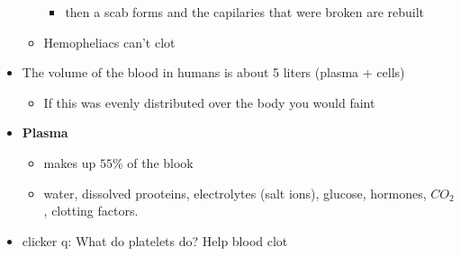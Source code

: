 \documentclass{article}
\theoremstyle{definition}
\begin{document}
\begin{itemize}
\begin{itemize}
\begin{itemize}
					\item then a scab forms and the capilaries that were broken are rebuilt
				\end{itemize}
			\item Hemopheliacs can't clot
		\end{itemize}
	\item The volume of the blood in humans is about 5 liters (plasma + cells)
		\begin{itemize}
			\item If this was evenly distributed over the body you would faint
		\end{itemize}
	\item \textbf{Plasma}
		\begin{itemize}
			\item makes up $55\%$ of the blook
			\item water, dissolved prooteins, electrolytes (salt ions), glucose, hormones, $CO_2$, clotting factors.
		\end{itemize}
	\item clicker q: What do platelets do? Help blood clot
\end{itemize}
\end{document}
